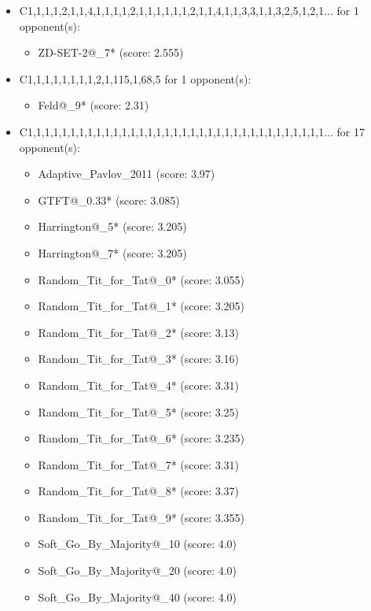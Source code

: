 \begin{appendices}
\begin{itemize}
    \item C1,1,1,1,2,1,1,4,1,1,1,1,2,1,1,1,1,1,1,2,1,1,4,1,1,3,3,1,1,3,2,5,1,2,1... for 1 opponent(s):
    \begin{multicols}{3}
         \begin{itemize}
            \item ZD-SET-2@\_7* (score: 2.555)
        \end{itemize}
     \end{multicols}
     
    \item C1,1,1,1,1,1,1,1,2,1,115,1,68,5 for 1 opponent(s):
    \begin{multicols}{3}
         \begin{itemize}
            \item Feld@\_9* (score: 2.31)
        \end{itemize}
     \end{multicols}
     
    \item C1,1,1,1,1,1,1,1,1,1,1,1,1,1,1,1,1,1,1,1,1,1,1,1,1,1,1,1,1,1,1,1,1,1,1... for 17 opponent(s):
    \begin{multicols}{3}
         \begin{itemize}
            \item Adaptive\_Pavlov\_2011 (score: 3.97)
            \item GTFT@\_0.33* (score: 3.085)
            \item Harrington@\_5* (score: 3.205)
            \item Harrington@\_7* (score: 3.205)
            \item Random\_Tit\_for\_Tat@\_0* (score: 3.055)
            \item Random\_Tit\_for\_Tat@\_1* (score: 3.205)
            \item Random\_Tit\_for\_Tat@\_2* (score: 3.13)
            \item Random\_Tit\_for\_Tat@\_3* (score: 3.16)
            \item Random\_Tit\_for\_Tat@\_4* (score: 3.31)
            \item Random\_Tit\_for\_Tat@\_5* (score: 3.25)
            \item Random\_Tit\_for\_Tat@\_6* (score: 3.235)
            \item Random\_Tit\_for\_Tat@\_7* (score: 3.31)
            \item Random\_Tit\_for\_Tat@\_8* (score: 3.37)
            \item Random\_Tit\_for\_Tat@\_9* (score: 3.355)
            \item Soft\_Go\_By\_Majority@\_10 (score: 4.0)
            \item Soft\_Go\_By\_Majority@\_20 (score: 4.0)
            \item Soft\_Go\_By\_Majority@\_40 (score: 4.0)
        \end{itemize}
     \end{multicols}
     

\end{itemize}
\end{appendices}
